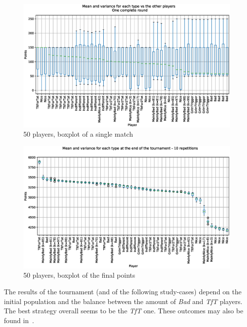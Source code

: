 \documentclass[journal,a4paper,10pt,twoside]{IEEEtran} %
\begin{document}
\begin{figure}[!ht]
    \centering
    \includegraphics[width=1\columnwidth]{../img/ipdmp/ipdmp-boxplot-single-match-50}
    \caption{50 players, boxplot of a single match}
    \label{fig:boxIPDMPsingle}
\end{figure}

\begin{figure}[!ht]
    \centering
    \includegraphics[width=1\columnwidth]{../img/ipdmp/ipdmp-boxplot-final-points-50}
    \caption{50 players, boxplot of the final points}
    \label{fig:boxIPDMPfinal}
\end{figure}

The results of the tournament (and of the following study-cases) depend on the initial population and the balance between the amount of \textit{Bad} and \textit{TfT} players. The best strategy overall seems to be the \textit{TfT} one.
These outcomes may also be found in~\cite{mathieu2017}.
\end{document}

